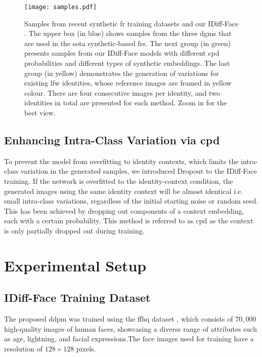 \documentclass[10pt,twocolumn,letterpaper]{article}
\newcommand{\approachname}{IDiff-Face }
\begin{document}
\begin{figure}[!]
\begin{center}
   \texttt{[image: samples.pdf]}
\end{center}
\vspace{-5mm}
   \caption{Samples from recent synthetic \acrshort{fr} training datasets and our \approachname. The upper box (in blue) shows samples from the three \acrshort{dgm}s that are used in the \acrshort{sota} synthetic-based \acrshort{fr}s. The next group (in green) presents samples from our \approachname models with different \acrshort{cpd} probabilities and different types of synthetic embeddings. The last group (in yellow) demonstrates the generation of variations for existing \acrshort{lfw} identities, whose reference images are framed in yellow colour. There are four consecutive images per identity, and two identities in total are presented for each method. Zoom in for the best view.}
\label{fig:sample_overview}
\vspace{-5mm}
\end{figure}

\vspace{-1mm}
\subsection{Enhancing Intra-Class Variation via \acrshort{cpd}}
\vspace{-2mm}
To prevent the model from overfitting to identity contexts, which limits the intra-class variation in the generated samples, we introduced Dropout \cite{Srivastava2014} to the \approachname training. If the network is overfitted to the identity-context condition, the generated images using the same identity context will be almost identical i.e. small intra-class variations, regardless of the initial starting noise or random seed. 
This has been achieved by dropping out components of a context embedding, each with a certain probability. This method is referred to as \acrfull{cpd} as the context is only partially dropped out during training.

\vspace{-3mm}
\section{Experimental Setup }
\vspace{-1mm}
\subsection{\approachname Training Dataset}
\vspace{-1mm}
The proposed \acrshort{ddpm} was trained using the \acrshort{ffhq} dataset \cite{Karras2018}, which consists of $70{,}000$ high-quality images of human faces, showcasing a diverse range of attributes such as age, lightning, and facial expressions.The face images used for training have a resolution of $128\times 128$ pixels. 
\end{document}
